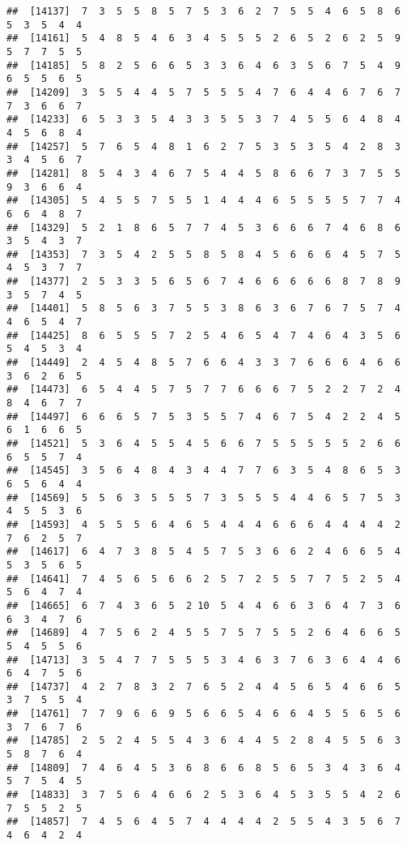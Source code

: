 \documentclass[
]{book}
\begin{document}
\begin{verbatim}
##  [14137]  7  3  5  5  8  5  7  5  3  6  2  7  5  5  4  6  5  8  6  5  3  5  4  4
##  [14161]  5  4  8  5  4  6  3  4  5  5  5  2  6  5  2  6  2  5  9  5  7  7  5  5
##  [14185]  5  8  2  5  6  6  5  3  3  6  4  6  3  5  6  7  5  4  9  6  5  5  6  5
##  [14209]  3  5  5  4  4  5  7  5  5  5  4  7  6  4  4  6  7  6  7  7  3  6  6  7
##  [14233]  6  5  3  3  5  4  3  3  5  5  3  7  4  5  5  6  4  8  4  4  5  6  8  4
##  [14257]  5  7  6  5  4  8  1  6  2  7  5  3  5  3  5  4  2  8  3  3  4  5  6  7
##  [14281]  8  5  4  3  4  6  7  5  4  4  5  8  6  6  7  3  7  5  5  9  3  6  6  4
##  [14305]  5  4  5  5  7  5  5  1  4  4  4  6  5  5  5  5  7  7  4  6  6  4  8  7
##  [14329]  5  2  1  8  6  5  7  7  4  5  3  6  6  6  7  4  6  8  6  3  5  4  3  7
##  [14353]  7  3  5  4  2  5  5  8  5  8  4  5  6  6  6  4  5  7  5  4  5  3  7  7
##  [14377]  2  5  3  3  5  6  5  6  7  4  6  6  6  6  6  8  7  8  9  3  5  7  4  5
##  [14401]  5  8  5  6  3  7  5  5  3  8  6  3  6  7  6  7  5  7  4  4  6  5  4  7
##  [14425]  8  6  5  5  5  7  2  5  4  6  5  4  7  4  6  4  3  5  6  5  4  5  3  4
##  [14449]  2  4  5  4  8  5  7  6  6  4  3  3  7  6  6  6  4  6  6  3  6  2  6  5
##  [14473]  6  5  4  4  5  7  5  7  7  6  6  6  7  5  2  2  7  2  4  8  4  6  7  7
##  [14497]  6  6  6  5  7  5  3  5  5  7  4  6  7  5  4  2  2  4  5  6  1  6  6  5
##  [14521]  5  3  6  4  5  5  4  5  6  6  7  5  5  5  5  5  2  6  6  6  5  5  7  4
##  [14545]  3  5  6  4  8  4  3  4  4  7  7  6  3  5  4  8  6  5  3  6  5  6  4  4
##  [14569]  5  5  6  3  5  5  5  7  3  5  5  5  4  4  6  5  7  5  3  4  5  5  3  6
##  [14593]  4  5  5  5  6  4  6  5  4  4  4  6  6  6  4  4  4  4  2  7  6  2  5  7
##  [14617]  6  4  7  3  8  5  4  5  7  5  3  6  6  2  4  6  6  5  4  5  3  5  6  5
##  [14641]  7  4  5  6  5  6  6  2  5  7  2  5  5  7  7  5  2  5  4  5  6  4  7  4
##  [14665]  6  7  4  3  6  5  2 10  5  4  4  6  6  3  6  4  7  3  6  6  3  4  7  6
##  [14689]  4  7  5  6  2  4  5  5  7  5  7  5  5  2  6  4  6  6  5  5  4  5  5  6
##  [14713]  3  5  4  7  7  5  5  5  3  4  6  3  7  6  3  6  4  4  6  6  4  7  5  6
##  [14737]  4  2  7  8  3  2  7  6  5  2  4  4  5  6  5  4  6  6  5  3  7  5  5  4
##  [14761]  7  7  9  6  6  9  5  6  6  5  4  6  6  4  5  5  6  5  6  3  7  6  7  6
##  [14785]  2  5  2  4  5  5  4  3  6  4  4  5  2  8  4  5  5  6  3  5  8  7  6  4
##  [14809]  7  4  6  4  5  3  6  8  6  6  8  5  6  5  3  4  3  6  4  5  7  5  4  5
##  [14833]  3  7  5  6  4  6  6  2  5  3  6  4  5  3  5  5  4  2  6  7  5  5  2  5
##  [14857]  7  4  5  6  4  5  7  4  4  4  4  2  5  5  4  3  5  6  7  4  6  4  2  4

\end{verbatim}
\end{document}
